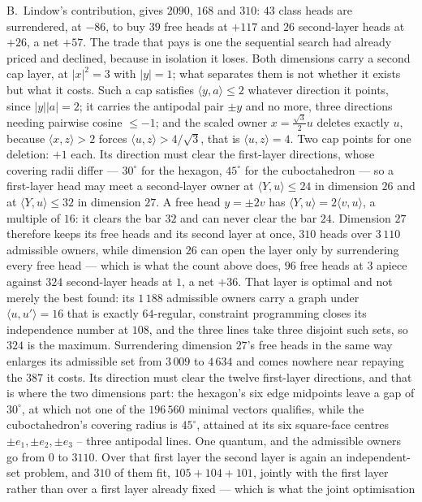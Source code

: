 \documentclass[11pt]{amsart}
\theoremstyle{remark}
\newcommand{\ip}[2]{\langle #1,#2\rangle}
\begin{document}
B.~Lindow's contribution, gives $2090$, $168$ and $310$: $43$ class heads
are surrendered, at $-86$, to buy $39$ free heads at $+117$ and $26$
second-layer heads at $+26$, a net $+57$. The trade that pays is one the sequential
search had already priced and declined, because in isolation it loses.  Both dimensions carry a second cap layer, at $|x|^{2}=3$ with $|y|=1$;
what separates them is not whether it exists but what it costs.  Such a cap satisfies
$\ip{y}{a}\le2$ whatever direction it points, since $|y||a|=2$; it carries the antipodal
pair $\pm y$ and no more, three directions needing pairwise cosine $\le-1$; and the scaled
owner $x=\tfrac{\sqrt3}{2}u$ deletes exactly $u$, because $\ip{x}{z}>2$ forces
$\ip{u}{z}>4/\sqrt3$, that is $\ip{u}{z}=4$.  Two cap points for one deletion: $+1$ each.
Its direction must clear the first-layer directions, whose covering radii differ ---
$30^{\circ}$ for the hexagon, $45^{\circ}$ for the cuboctahedron --- so a first-layer head
may meet a second-layer owner at $\ip{Y}{u}\le24$ in dimension $26$ and at
$\ip{Y}{u}\le32$ in dimension $27$.  A free head $y=\pm2v$ has $\ip{Y}{u}=2\ip{v}{u}$, a
multiple of $16$: it clears the bar $32$ and can never clear the bar $24$.  Dimension $27$
therefore keeps its free heads and its second layer at once, $310$ heads over $3\,110$
admissible owners, while dimension $26$ can open the layer only by surrendering every free
head --- which is what the count above does, $96$ free heads at $3$ apiece against $324$
second-layer heads at $1$, a net $+36$.  That layer is optimal and not merely the best found:
its $1\,188$ admissible owners carry a graph under $\ip{u}{u'}=16$ that is exactly
$64$-regular, constraint programming closes its independence number at $108$, and the three
lines take three disjoint such sets, so $324$ is the maximum.  Surrendering dimension $27$'s free heads in the same
way enlarges its admissible set from $3\,009$ to $4\,634$ and comes nowhere near repaying
the $387$ it costs.
Its direction must clear the twelve first-layer directions, and that is where the two
dimensions part: the hexagon's six edge midpoints leave a gap of $30^{\circ}$, at which
not one of the $196\,560$ minimal vectors qualifies, while the cuboctahedron's covering
radius is $45^{\circ}$, attained at its six square-face centres $\pm e_{1},\pm e_{2},
\pm e_{3}$ -- three antipodal lines.  One quantum, and the admissible owners go from $0$
to $3110$. Over that first layer the second layer is again an
independent-set problem, and $310$ of them fit, $105+104+101$, jointly with the first
layer rather than over a first layer already fixed --- which is what the joint optimisation
\end{document}
